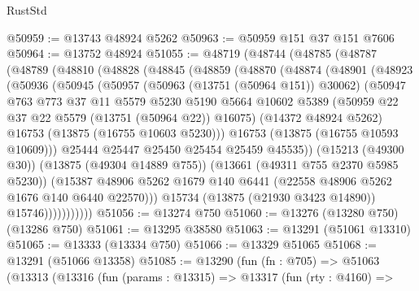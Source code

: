 \begin{lexlean}{RustStd}
\begin{coremodule}
@50959 := @13743 @48924 @5262
@50963 := @50959 @151 @37 @151 @7606
@50964 := @13752 @48924
@51055 := @48719
    (@48744
      (@48785
        (@48787
          (@48789
            (@48810
              (@48828
                (@48845
                  (@48859
                    (@48870
                      (@48874
                        (@48901
                          (@48923
                            (@50936
                              (@50945
                                (@50957
                                  (@50963 (@13751 (@50964 @151)) @30062)
                                  (@50947
                                    @763
                                    @773
                                    @37
                                    @11
                                    @5579
                                    @5230
                                    @5190
                                    @5664
                                    @10602
                                    @5389
                                    (@50959 @22 @37 @22 @5579 (@13751 (@50964 @22)) @16075)
                                    (@14372 @48924 @5262)
                                    @16753
                                    (@13875 (@16755 @10603 @5230)))
                                  @16753
                                  (@13875 (@16755 @10593 @10609)))
                                @25444
                                @25447
                                @25450
                                @25454
                                @25459
                                @45535))
                            (@15213 (@49300 @30))
                            (@13875 (@49304 @14889 @755))
                            (@13661 (@49311 @755 @2370 @5985 @5230))
                            (@15387
                              @48906
                              @5262
                              @1679
                              @140
                              @6441
                              (@22558 @48906 @5262 @1676 @140 @6440 @22570)))
                          @15734
                          (@13875 (@21930 @3423 @14890))
                          @15746)))))))))))
@51056 := @13274 @750
@51060 := @13276 (@13280 @750) (@13286 @750)
@51061 := @13295 @38580
@51063 := @13291 (@51061 @13310)
@51065 := @13333 (@13334 @750)
@51066 := @13329 @51065
@51068 := @13291 (@51066 @13358)
@51085 := @13290
    (fun (fn : @705) =>
    @51063
      (@13313
        (@13316
          (fun (params : @13315) =>
          @13317
            (fun (rty : @4160) =>

\end{coremodule}
\end{lexlean}
